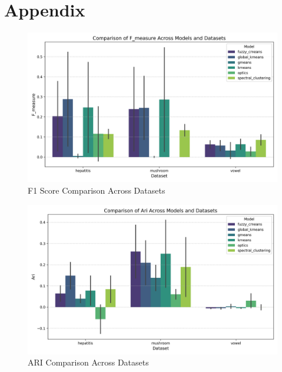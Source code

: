 \section{Appendix}
\label{sec:appendix}


\begin{figure}[ht!]
    \centering
    \includegraphics[width=\textwidth]{figures/model_comparison_f_measure.png}
    \caption{F1 Score Comparison Across Datasets}
    \label{fig:model_comparison_f_measure_full}
\end{figure}

\begin{figure}[ht!]
    \centering
    \includegraphics[width=\textwidth]{figures/model_comparison_ari.png}
    \caption{ARI Comparison Across Datasets}
    \label{fig:model_comparison_ari_full}
\end{figure}

